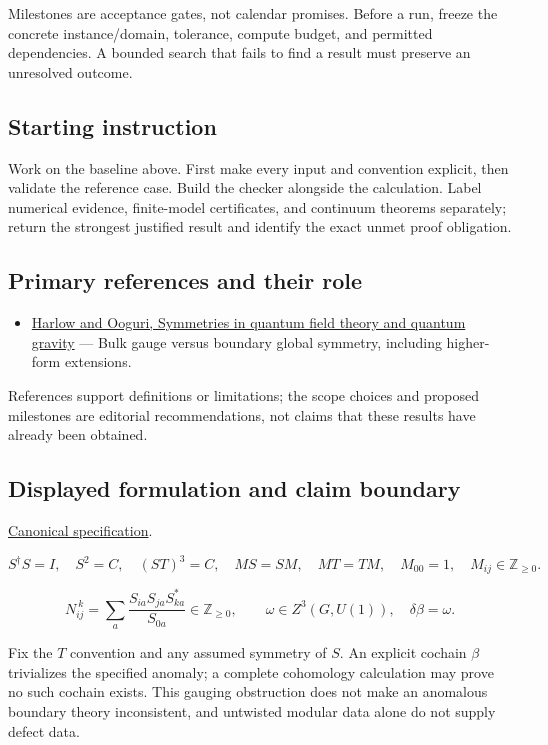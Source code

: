 \documentclass[
  11pt,
]{article}
\providecommand{\tightlist}{%
  \setlength{\itemsep}{0pt}\setlength{\parskip}{0pt}}
\begin{document}
Milestones are acceptance gates, not calendar promises. Before a run,
freeze the concrete instance/domain, tolerance, compute budget, and
permitted dependencies. A bounded search that fails to find a result
must preserve an unresolved outcome.

\subsection{Starting instruction}

Work on the baseline above. First make every input and convention
explicit, then validate the reference case. Build the checker alongside
the calculation. Label numerical evidence, finite-model certificates,
and continuum theorems separately; return the strongest justified result
and identify the exact unmet proof obligation.

\subsection{Primary references and their role}

\begin{itemize}
\tightlist
\item
  \href{https://arxiv.org/abs/1810.05338}{Harlow and Ooguri, Symmetries
  in quantum field theory and quantum gravity} --- Bulk gauge versus
  boundary global symmetry, including higher-form extensions.
\end{itemize}

References support definitions or limitations; the scope choices and
proposed milestones are editorial recommendations, not claims that these
results have already been obtained.

\subsection{Displayed formulation and claim boundary}

\href{https://github.com/rick-stevens-ai/Pure-Thought/blob/main/PRDs/08-Swampland-Modularity-Symmetries.md}{Canonical
specification}.

\[S^\dagger S=I,\quad S^2=C,\quad(ST)^3=C,\quad
MS=SM,\quad MT=TM,\quad M_{00}=1,\quad M_{ij}\in\mathbb Z_{\ge0}.\]

\[N_{ij}^{\ k}=\sum_a\frac{S_{ia}S_{ja}S_{ka}^*}{S_{0a}}
\in\mathbb Z_{\ge0},\qquad \omega\in Z^3(G,U(1)),\quad\delta\beta=\omega.\]

Fix the \(T\) convention and any assumed symmetry of \(S\). An explicit
cochain \(\beta\) trivializes the specified anomaly; a complete
cohomology calculation may prove no such cochain exists. This gauging
obstruction does not make an anomalous boundary theory inconsistent, and
untwisted modular data alone do not supply defect data.
\end{document}
